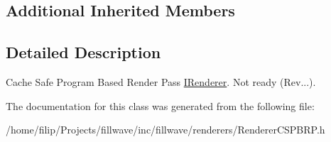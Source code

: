 \subsection*{Additional Inherited Members}


\subsection{Detailed Description}
Cache Safe Program Based Render Pass \hyperlink{classflw_1_1flf_1_1IRenderer}{I\+Renderer}. Not ready (Rev...). 

The documentation for this class was generated from the following file\+:\begin{DoxyCompactItemize}
\item 
/home/filip/\+Projects/fillwave/inc/fillwave/renderers/Renderer\+C\+S\+P\+B\+R\+P.\+h\end{DoxyCompactItemize}
